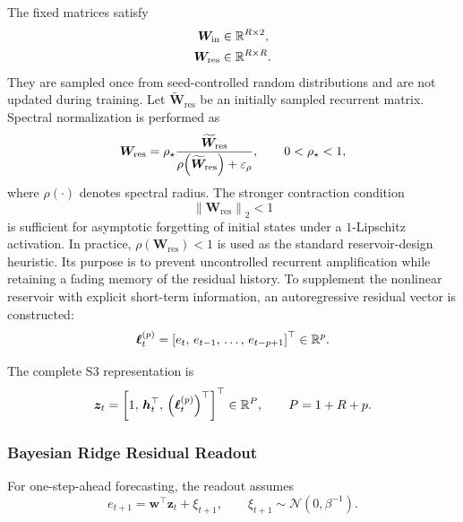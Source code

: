 \documentclass[review,number,sort&compress]{elsarticle}
\begin{document}
The fixed matrices satisfy
\begin{align}
    \bm{W}_{\mathrm{in}}
    &\in
    \mathbb{R}^{R\times2},
    \\
    \bm{W}_{\mathrm{res}}
    &\in
    \mathbb{R}^{R\times R}.
\end{align}
They are sampled once from seed-controlled random distributions and are not
updated during training.
Let $\widetilde{\bm{W}}_{\mathrm{res}}$ be an initially sampled recurrent
matrix. Spectral normalization is performed as
\begin{equation}
    \bm{W}_{\mathrm{res}}
    =
    \rho_\star
    \frac{
        \widetilde{\bm{W}}_{\mathrm{res}}
    }{
        \rho\!\left(
        \widetilde{\bm{W}}_{\mathrm{res}}
        \right)+\varepsilon_\rho
    },
    \qquad
    0<\rho_\star<1,
    \label{eq:spectral_normalization}
\end{equation}
where $\rho(\cdot)$ denotes spectral radius.
The stronger contraction condition
\begin{equation}
    \left\|
    \bm{W}_{\mathrm{res}}
    \right\|_2
    <1
\end{equation}
is sufficient for asymptotic forgetting of initial states under a
$1$-Lipschitz activation. In practice,
$\rho(\bm{W}_{\mathrm{res}})<1$ is used as the standard reservoir-design
heuristic. Its purpose is to prevent uncontrolled recurrent amplification while
retaining a fading memory of the residual history.
To supplement the nonlinear reservoir with explicit short-term information, an
autoregressive residual vector is constructed:
\begin{equation}
    \bm{\ell}_t^{(p)}
    =
    \left[
    e_t,\,
    e_{t-1},\,
    \ldots,\,
    e_{t-p+1}
    \right]^\top
    \in\mathbb{R}^p.
\end{equation}

The complete S3 representation is
\begin{equation}
    \bm{z}_t
    =
    \left[
    1,\,
    \bm{h}_t^\top,\,
    \left(\bm{\ell}_t^{(p)}\right)^\top
    \right]^\top
    \in
    \mathbb{R}^{P},
    \qquad
    P=1+R+p.
    \label{eq:s3_representation}
\end{equation}

\subsubsection{Bayesian Ridge Residual Readout}

For one-step-ahead forecasting, the readout assumes
\begin{equation}
    e_{t+1}
    =
    \bm{w}^\top\bm{z}_t
    +
    \xi_{t+1},
    \qquad
    \xi_{t+1}
    \sim
    \mathcal{N}(0,\beta^{-1}).
    \label{eq:bayesian_likelihood}
\end{equation}
\end{document}
